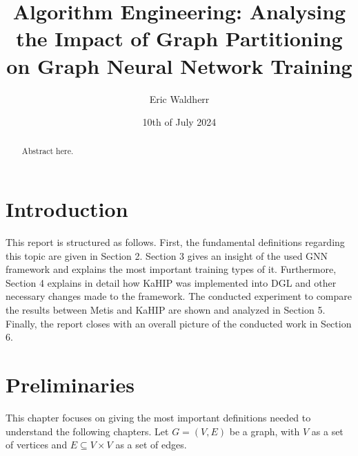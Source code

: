 \documentclass[acmsmall,nonacm,screen,review]{acmart}
\title{Algorithm Engineering: Analysing the Impact of Graph Partitioning on Graph Neural Network Training}
\author{Eric Waldherr}
\affiliation{%
  \institution{Heidelberg University}
  \streetaddress{Im Neuenheimer Feld 205}
  \city{Heidelberg}
  \state{Baden-Württemberg}
  \country{Germany}
  \postcode{69120}
}
\date{10th of July 2024}
\begin{document}
\begin{abstract}
Abstract here.
\end{abstract}
\maketitle

\section{Introduction}
This report is structured as follows. First, the fundamental definitions regarding this topic are given in Section 2. Section 3 gives an insight of the used GNN framework and explains the most important training types of it. Furthermore, Section 4 explains in detail how KaHIP was implemented into DGL and other necessary changes made to the framework. The conducted experiment to compare the results between Metis and KaHIP are shown and analyzed in Section 5. Finally, the report closes with an overall picture of the conducted work in Section 6. 
\section{Preliminaries}
This chapter focuses on giving the most important definitions needed to understand the following chapters. Let $G=(V,E)$ be a graph, with $V$ as a set of vertices and $E \subseteq V \times V$ as a set of edges.
\end{document}
